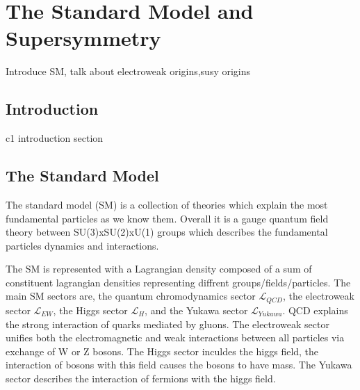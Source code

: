 



\setcounter{secnumdepth}{3}
\setcounter{tocdepth}{3}
\setlength{\parskip}{\smallskipamount}
\setlength{\parindent}{0pt}


\makeatletter


\providecommand{\tabularnewline}{\\}


\makeatother

%

\chapter{The Standard Model and Supersymmetry}

\begin{chapterabstract}
Introduce SM, talk about electroweak origins,susy origins
\end{chapterabstract}

\section{Introduction}

c1 introduction section

\section{The Standard Model}

The standard model (SM) is a collection of theories which explain the most fundamental particles as we know them. Overall it is a gauge quantum field theory between SU(3)xSU(2)xU(1) groups which describes the fundamental particles  dynamics and interactions.


The SM is represented with a Lagrangian density composed of a sum of constituent lagrangian densities representing diffrent groups/fields/particles. The main SM sectors are, the quantum chromodynamics sector $\mathcal{L}_{QCD}$, the electroweak sector $\mathcal{L}_{EW}$, the Higgs sector $\mathcal{L}_{H}$, and the Yukawa sector $\mathcal{L}_{Yukawa}$. QCD explains the strong interaction of quarks mediated by gluons. The electroweak sector unifies both the electromagnetic and weak interactions between all particles via exchange of W or Z bosons. The Higgs sector inculdes the higgs field, the interaction of bosons with this field causes the bosons to have mass. The Yukawa sector describes the interaction of fermions with the higgs field.

